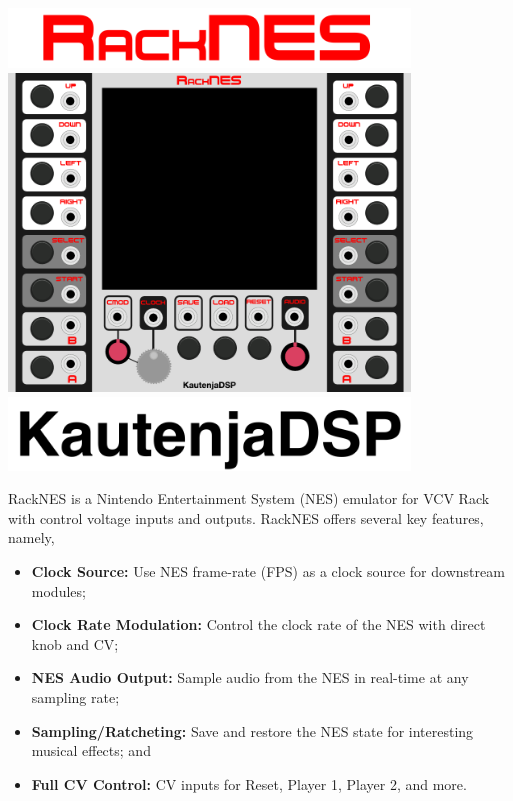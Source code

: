 \documentclass[12pt,a4paper]{article}
\begin{document}
\thispagestyle{empty}
\vspace*{\fill}
\begin{center}
\includegraphics[width=0.8\textwidth]{RackNES-Logo}
\linebreak\linebreak\linebreak\linebreak
\includegraphics[width=0.8\textwidth]{RackNES-Module}
\linebreak\linebreak\linebreak\linebreak
\includegraphics[width=0.8\textwidth]{KautenjaDSP}
\end{center}
\vspace*{\fill}
\clearpage


RackNES is a Nintendo Entertainment System (NES) emulator for VCV Rack with
control voltage inputs and outputs. RackNES offers several key features, namely,

\begin{itemize}
  \item \textbf{Clock Source:} Use NES frame-rate (FPS) as a clock source for downstream modules;
  \item \textbf{Clock Rate Modulation:} Control the clock rate of the NES with direct knob and CV;
  \item \textbf{NES Audio Output:} Sample audio from the NES in real-time at any sampling rate;
  \item \textbf{Sampling/Ratcheting:} Save and restore the NES state for interesting musical effects; and
  \item \textbf{Full CV Control:} CV inputs for Reset, Player 1, Player 2, and more.
\end{itemize}
\end{document}
